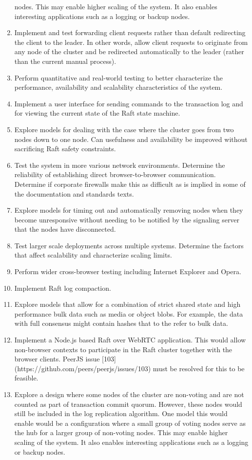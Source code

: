 \documentclass{acmtog} %
\begin{document}
\begin{enumerate}
  nodes. This may enable higher scaling of the system. It also enables
  interesting applications such as a logging or backup nodes.
\item Implement and test forwarding client requests rather than default
  redirecting the client to the leader. In other words, allow client
  requests to originate from any node of the cluster and be redirected
  automatically to the leader (rather than the current manual
  process).
\item Perform quantitative and real-world testing to better characterize
  the performance, availability and scalability characteristics of the
  system.
\item Implement a user interface for sending commands to the transaction
  log and for viewing the current state of the Raft state machine.
\item Explore models for dealing with the case where the cluster goes from
  two nodes down to one node. Can usefulness and availability be
  improved without sacrificing Raft safety constraints.
\item Test the system in more various network environments. Determine the
  reliability of establishing direct browser-to-browser communication.
  Determine if corporate firewalls make this as difficult as is
  implied in some of the documentation and standards texts.
\item Explore models for timing out and automatically removing nodes
  when they become unresponsive without needing to be notified by the
  signaling server that the nodes have disconnected.
\item Test larger scale deployments across multiple systems. Determine the
  factors that affect scalability and characterize scaling limits.
\item Perform wider cross-browser testing including Internet Explorer and
  Opera.
\item Implement Raft log compaction.
\item Explore models that allow for a combination of strict shared state
  and high performance bulk data such as media or object blobs. For
  example, the data with full consensus might contain hashes that to
  the refer to bulk data.
\item Implement a Node.js based Raft over WebRTC application. This would
  allow non-browser contexts to participate in the Raft cluster
  together with the browser clients. PeerJS issue
  [103](https://github.com/peers/peerjs/issues/103) must be resolved
  for this to be feasible.
\item Explore a design where some nodes of the cluster are non-voting and
  are not counted as part of transaction commit quorum. However, these
  nodes would still be included in the log replication algorithm. One
  model this would enable would be a configuration where a small group
  of voting nodes serve as the hub for a larger group of non-voting
  nodes. This may enable higher scaling of the system. It also enables
  interesting applications such as a logging or backup nodes.
\end{enumerate}
\end{document}
